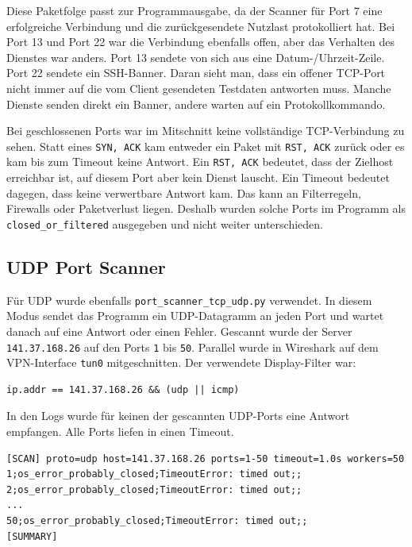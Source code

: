\documentclass{kdiartcl}
\begin{document}
Diese Paketfolge passt zur Programmausgabe, da der Scanner für Port 7 eine erfolgreiche Verbindung und die zurückgesendete Nutzlast protokolliert hat. Bei Port 13 und Port 22 war die Verbindung ebenfalls offen, aber das Verhalten des Dienstes war anders. Port 13 sendete von sich aus eine Datum-/Uhrzeit-Zeile. Port 22 sendete ein SSH-Banner. Daran sieht man, dass ein offener TCP-Port nicht immer auf die vom Client gesendeten Testdaten antworten muss. Manche Dienste senden direkt ein Banner, andere warten auf ein Protokollkommando.

Bei geschlossenen Ports war im Mitschnitt keine vollständige TCP-Verbindung zu sehen. Statt eines \texttt{SYN, ACK} kam entweder ein Paket mit \texttt{RST, ACK} zurück oder es kam bis zum Timeout keine Antwort. Ein \texttt{RST, ACK} bedeutet, dass der Zielhost erreichbar ist, auf diesem Port aber kein Dienst lauscht. Ein Timeout bedeutet dagegen, dass keine verwertbare Antwort kam. Das kann an Filterregeln, Firewalls oder Paketverlust liegen. Deshalb wurden solche Ports im Programm als \texttt{closed\_or\_filtered} ausgegeben und nicht weiter unterschieden.

\subsection{UDP Port Scanner}

Für UDP wurde ebenfalls \texttt{port\_scanner\_tcp\_udp.py} verwendet. In diesem Modus sendet das Programm ein UDP-Datagramm an jeden Port und wartet danach auf eine Antwort oder einen Fehler. Gescannt wurde der Server \texttt{141.37.168.26} auf den Ports \texttt{1} bis \texttt{50}. Parallel wurde in Wireshark auf dem VPN-Interface \texttt{tun0} mitgeschnitten. Der verwendete Display-Filter war:

\begin{verbatim}
ip.addr == 141.37.168.26 && (udp || icmp)
\end{verbatim}

In den Logs wurde für keinen der gescannten UDP-Ports eine Antwort empfangen. Alle Ports liefen in einen Timeout.

\begin{verbatim}
[SCAN] proto=udp host=141.37.168.26 ports=1-50 timeout=1.0s workers=50
1;os_error_probably_closed;TimeoutError: timed out;;
2;os_error_probably_closed;TimeoutError: timed out;;
...
50;os_error_probably_closed;TimeoutError: timed out;;
[SUMMARY]
\end{verbatim}
\end{document}
